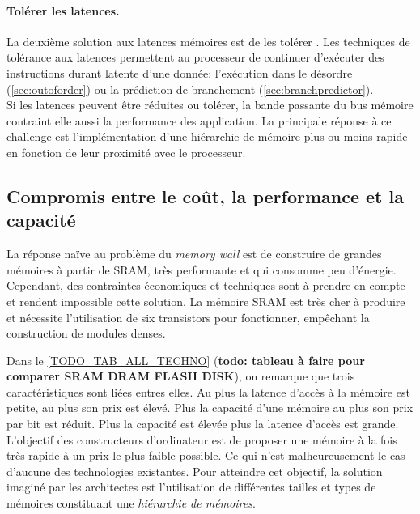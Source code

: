 \paragraph{Tolérer les latences.}
La deuxième solution aux latences mémoires est de les tolérer \cite{Bakshi2000}. Les techniques de tolérance aux latences permettent au processeur de continuer d’exécuter des instructions durant latente d’une donnée: l’exécution dans le désordre (\autoref{sec:outoforder}) ou la prédiction de branchement (\autoref{sec:branchpredictor}).\\


Si les latences peuvent être réduites ou tolérer, la bande passante du bus mémoire contraint elle aussi la performance des application. La principale réponse à ce challenge est l’implémentation d’une hiérarchie de mémoire plus ou moins rapide en fonction de leur proximité avec le processeur. 


\subsection{Compromis entre le coût, la performance et la capacité } \label{sec:hierarchie_true}

La réponse naïve au problème du \textit{memory wall} est de construire de grandes mémoires à partir de SRAM, très performante et qui consomme peu d'énergie. Cependant, des contraintes économiques et techniques sont à prendre en compte et rendent impossible cette solution. La mémoire SRAM est très cher à produire et nécessite l'utilisation de six transistors pour fonctionner, empêchant la construction de modules denses. 

Dans le \autoref{TODO_TAB_ALL_TECHNO} (\textbf{todo: tableau à faire pour comparer SRAM DRAM FLASH DISK}), on remarque que trois caractéristiques sont liées entres elles. Au plus la latence d'accès à la mémoire est petite, au plus son prix est élevé. Plus la capacité d'une mémoire au plus son prix par bit est réduit. Plus la capacité est élevée plus la latence d'accès est grande.
L'objectif des constructeurs d'ordinateur est de proposer une mémoire à la fois très rapide à un prix le plus faible possible. Ce qui n'est malheureusement le cas d'aucune des technologies existantes. Pour atteindre cet objectif, la solution imaginé par les architectes est l'utilisation de différentes tailles et types de mémoires constituant une \textit{hiérarchie de mémoires}.

